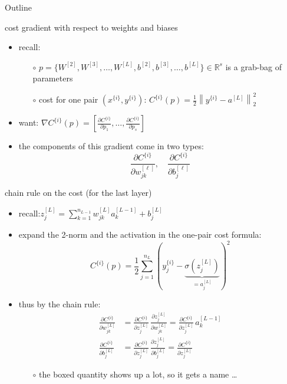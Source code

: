 \documentclass[xcolor={svgnames},
               hyperref={colorlinks,citecolor=DeepPink4,linkcolor=FireBrick,urlcolor=Maroon}]
               {beamer}
\newcommand{\grad}{\nabla}
\newcommand{\RR}{\mathbb{R}}
\begin{document}
\begin{frame}{Outline}
\end{frame}


\begin{frame}{cost gradient with respect to weights and biases}

\begin{itemize}
\item recall:
    \begin{itemize}
    \item[$\circ$] $p = \{W^{[2]},W^{[3]},\dots,W^{[L]},b^{[2]},b^{[3]},\dots,b^{[L]}\} \in \RR^s$ is a grab-bag of parameters
    \item[$\circ$] cost for one pair $(x^{\{i\}},y^{\{i\}})$:  \qquad \small $\displaystyle C^{\{i\}}(p) = \frac{1}{2} \left\|y^{\{i\}} - a^{[L]}\right\|_2^2$ \normalsize
    \end{itemize}

\medskip
\item want: \qquad \small  $\displaystyle \grad C^{\{i\}}(p) = \left[\frac{\partial C^{\{i\}}}{\partial p_1},\dots,\frac{\partial C^{\{i\}}}{\partial p_s}\right]$ \normalsize
\item the components of this gradient come in two types:
    $$\frac{\partial C^{\{i\}}}{\partial w_{jk}^{[\ell]}}, \quad \frac{\partial C^{\{i\}}}{\partial b_j^{[\ell]}}$$
\end{itemize}
\end{frame}


\begin{frame}{chain rule on the cost (for the last layer)}

\begin{itemize}
\item recall:\quad $\displaystyle z_j^{[L]} = \sum_{k=1}^{n_{L-1}} w_{jk}^{[L]} a_k^{[L-1]} + b_j^{[L]}$
\item expand the 2-norm and the activation in the one-pair cost formula:
    $$C^{\{i\}}(p) = \frac{1}{2} \sum_{j=1}^{n_L} (y_j^{\{i\}} - \underbrace{\sigma(z_j^{[L]})}_{= a_j^{[L]}})^2$$

\vspace{-4mm}
\item thus by the chain rule:
\begin{align*}
\frac{\partial C^{\{i\}}}{\partial w_{jk}^{[L]}} &= \boxed{\frac{\partial C^{\{i\}}}{\partial z_j^{[L]}}}\, \frac{\partial z_j^{[L]}}{\partial w_{jk}^{[L]}} = \boxed{\frac{\partial C^{\{i\}}}{\partial z_j^{[L]}}}\, a_k^{[L-1]} \\
\frac{\partial C^{\{i\}}}{\partial b_{j}^{[L]}} &= \boxed{\frac{\partial C^{\{i\}}}{\partial z_j^{[L]}}}\, \frac{\partial z_j^{[L]}}{\partial b_{j}^{[L]}} = \boxed{\frac{\partial C^{\{i\}}}{\partial z_j^{[L]}}}
\end{align*}
    \begin{itemize}
    \item[$\circ$] the boxed quantity shows up a lot, so it gets a name \dots
    \end{itemize}
\end{itemize}
\end{frame}
\end{document}
